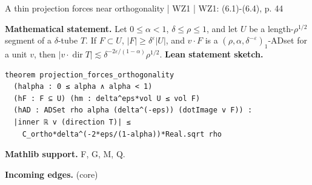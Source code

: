 \documentclass[10pt,a4paper]{article}
\newcommand{\nodecard}[1]{\hyperlink{node-#1}{\texttt{\detokenize{#1}}}}
\begin{document}
\begin{minipage}{\linewidth}
\hypertarget{node-L6_2}{}
\begin{tcolorbox}[colback=white,colframe=slopefg,colbacktitle=slopebg,coltitle=ink,boxrule=0.45pt,arc=1.6mm,left=3mm,right=3mm,top=2mm,bottom=2mm,title={\sffamily\bfseries WZ1 Lemma 6.2 \hfill \texttt{L6\_2}}]
{\sffamily\small\color{muted}A thin projection forces near orthogonality | WZ1 | WZ1: (6.1)-(6.4), p. 44}\par
\textbf{Mathematical statement.} Let $0\le\alpha<1$, $\delta\le\rho\le1$, and let $U$ be a length-$\rho^{1/2}$ segment of a $\delta$-tube $T$.
If $F\subset U$, $|F|\ge\delta^\varepsilon|U|$, and $v\cdot F$ is a $(\rho,\alpha,\delta^{-\varepsilon})_1$-ADset for a unit $v$, then
$|v\cdot\operatorname{dir}T|\lesssim\delta^{-2\varepsilon/(1-\alpha)}\rho^{1/2}$.
\smallskip\textbf{Lean statement sketch.}
\begin{Verbatim}[fontsize=\small,breaklines=true,breakanywhere=true,tabsize=2]
theorem projection_forces_orthogonality
  (halpha : 0 ≤ alpha ∧ alpha < 1)
  (hF : F ⊆ U) (hm : delta^eps*vol U ≤ vol F)
  (hAD : ADSet rho alpha (delta^(-eps)) (dotImage v F)) :
  |inner ℝ v (direction T)| ≤
    C_ortho*delta^(-2*eps/(1-alpha))*Real.sqrt rho
\end{Verbatim}
{\footnotesize\textbf{Mathlib support.} F, G, M, Q.\par
\textbf{Incoming edges.} \nodecard{DAD} (core)\par}

\end{tcolorbox}\end{minipage}\par\medskip
\end{document}
